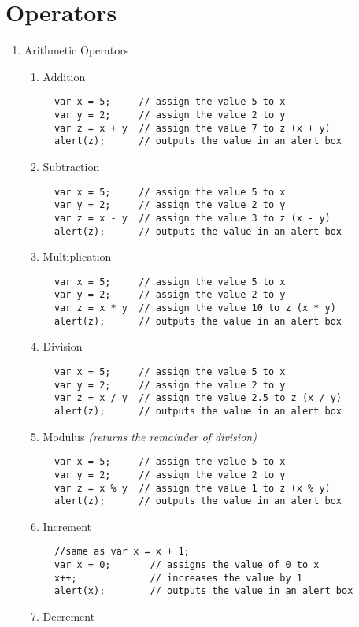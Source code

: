 \documentclass{article}
\begin{document}
\section{Operators}
\begin{enumerate}
\item Arithmetic Operators
\begin{enumerate}
\item Addition
\begin{lstlisting}
  var x = 5;     // assign the value 5 to x
  var y = 2;     // assign the value 2 to y
  var z = x + y  // assign the value 7 to z (x + y)
  alert(z);      // outputs the value in an alert box
\end{lstlisting}
\item Subtraction
\begin{lstlisting}
  var x = 5;     // assign the value 5 to x
  var y = 2;     // assign the value 2 to y
  var z = x - y  // assign the value 3 to z (x - y)
  alert(z);      // outputs the value in an alert box
\end{lstlisting}
\item Multiplication
\begin{lstlisting}
  var x = 5;     // assign the value 5 to x
  var y = 2;     // assign the value 2 to y
  var z = x * y  // assign the value 10 to z (x * y)
  alert(z);      // outputs the value in an alert box
\end{lstlisting}
\item Division
\begin{lstlisting}
  var x = 5;     // assign the value 5 to x
  var y = 2;     // assign the value 2 to y
  var z = x / y  // assign the value 2.5 to z (x / y)
  alert(z);      // outputs the value in an alert box
\end{lstlisting}
\item Modulus \textit{(returns the remainder of division)}
\begin{lstlisting}
  var x = 5;     // assign the value 5 to x
  var y = 2;     // assign the value 2 to y
  var z = x % y  // assign the value 1 to z (x % y)
  alert(z);      // outputs the value in an alert box
\end{lstlisting}
\item Increment
\begin{lstlisting}
  //same as var x = x + 1;
  var x = 0;       // assigns the value of 0 to x
  x++;             // increases the value by 1
  alert(x);        // outputs the value in an alert box
\end{lstlisting}
\item Decrement

\end{enumerate}
\end{enumerate}
\end{document}
